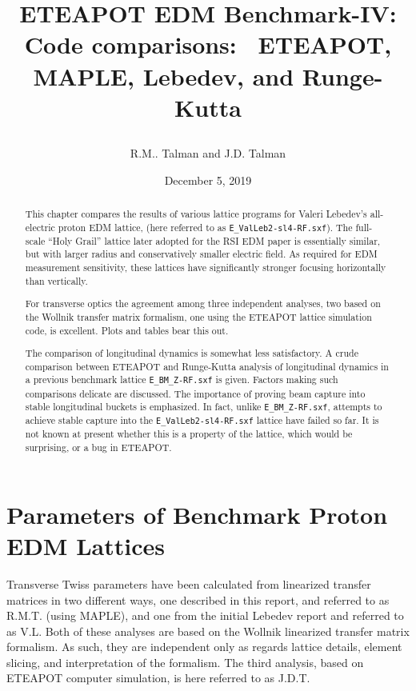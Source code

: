 \documentclass[12]{article}
\begin{document}
\date{December 5, 2019}

\title{
\centerline{}
\centerline{}
\centerline{}
ETEAPOT EDM Benchmark-IV: Code comparisons: \
ETEAPOT, MAPLE, Lebedev, and Runge-Kutta 
}
\author{R.M.. Talman and J.D. Talman
}

\maketitle


\begin{abstract}
This chapter compares the results of various lattice 
programs for Valeri Lebedev's all-electric proton EDM lattice, 
(here referred to as {\tt E\_ValLeb2-sl4-RF.sxf}).
The full-scale ``Holy Grail'' lattice later adopted for
the RSI EDM paper\cite{RSI-lattrice} is essentially similar, 
but with larger radius and conservatively smaller electric field.
As required for EDM measurement sensitivity, these lattices have 
significantly stronger focusing horizontally than vertically. 

For transverse optics the agreement among three independent 
analyses, two based on the Wollnik transfer matrix formalism, 
one using the ETEAPOT lattice simulation code, is excellent. 
Plots and tables bear this out.

The comparison of longitudinal dynamics is somewhat less
satisfactory. A crude comparison between ETEAPOT 
and Runge-Kutta analysis of longitudinal dynamics in a
previous benchmark lattice {\tt E\_BM\_Z-RF.sxf} is given. 
Factors making such comparisons delicate are discussed. 
The importance of proving beam capture into stable longitudinal 
buckets is emphasized. In fact, unlike {\tt E\_BM\_Z-RF.sxf},
attempts to achieve stable capture into the 
{\tt E\_ValLeb2-sl4-RF.sxf} lattice have failed so far.
It is not known at present whether this is a property of the
lattice, which would be surprising, or a bug in ETEAPOT.
\end{abstract}
%

\section{Parameters of Benchmark Proton EDM Lattices}
Transverse Twiss parameters have been calculated from linearized transfer matrices
in two different ways, one described in this report, and referred to as R.M.T.
(using MAPLE), 
and one from the initial Lebedev report\cite{ValLeb2} and referred to as V.L. 
Both of these analyses are based on the Wollnik\cite{Wollnik} linearized transfer 
matrix formalism. As such, they are independent only as regards lattice details, 
element slicing, and interpretation of the formalism. The third analysis, based
on ETEAPOT computer simulation, is here referred to as J.D.T. 
\end{document}
